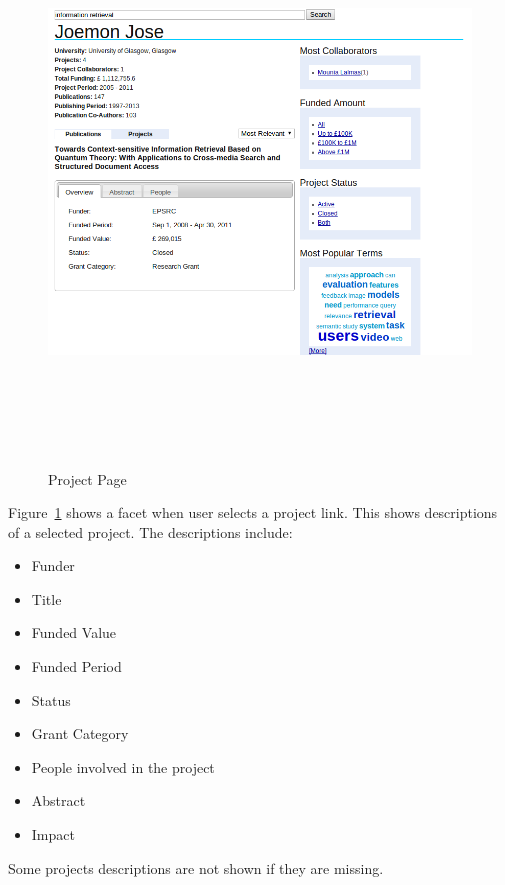 \begin{figure}
 \centering
 \includegraphics[width=13cm,height=15cm,keepaspectratio]{./figures/newProfileSelectedProject.png}
 \caption{Project Page} \label{fig:newProfileSelectedProject} 
 \end{figure}
 
 Figure~\ref{fig:newProfileSelectedProject} shows a facet when user selects a project link. This shows descriptions of a selected project.
 The descriptions include:
 \begin{itemize}
  \item Funder
  \item Title
  \item Funded Value
  \item Funded Period
  \item Status
  \item Grant Category
  \item People involved in the project
  \item Abstract
  \item Impact
 \end{itemize}
 Some projects descriptions are not shown if they are missing.